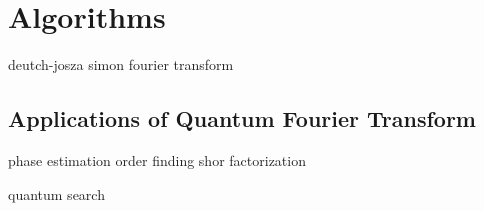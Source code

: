 \documentclass[12pt,a4paper]{report}
\begin{document}
\part{Algorithms}
{deutch-josza}
{simon}
{fourier transform}
\chapter{Applications of Quantum Fourier Transform}
{phase estimation}
{order finding}
{shor}
{factorization}


{quantum search}
\end{document}
